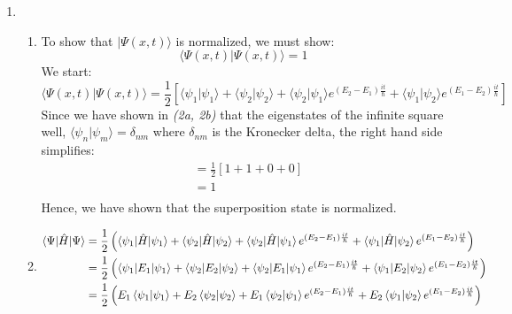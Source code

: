 \documentclass[10pt]{article}
\begin{document}
\begin{enumerate}
\begin{enumerate}
  \end{enumerate}
  \item 
    \begin{enumerate}
      \item 
        To show that $ \lvert \Psi \left( x,t \right) \rangle $ is normalized, we must show:
        \begin{equation*}
          \langle \Psi \left( x,t \right) \vert \Psi \left( x,t \right) \rangle = 1
        \end{equation*}
        We start:
        \begin{equation*}
        \langle \Psi \left( x,t \right) \vert \Psi \left( x,t \right) \rangle = \frac{1}{2}\left[ \langle \psi_{1}\vert\psi_{1} \rangle + \langle \psi_{2} \vert \psi_{2} \rangle + \langle \psi_{2} \vert \psi_{1} \rangle e ^ {\left( E_2-E_1 \right) \frac{it}{\hslash}} + \langle \psi_{1} \vert \psi_{2} \rangle e ^ {\left( E_1-E_2 \right) \frac{it}{\hslash}} \right]
        \end{equation*}
        Since we have shown in \textit{(2a, 2b)} that the eigenstates of the infinite square well, $ \langle \psi_{n} \vert \psi_{m} \rangle = \delta_{nm} $ where $ \delta_{nm} $ is the Kronecker delta, the right hand side simplifies:
        \begin{align*}
        &= \frac{1}{2} \left[ 1+1+0+0 \right]  \\
        &= 1 \\
        \end{align*}
        Hence, we have shown that the superposition state is normalized.
      \item 
        \begin{align*}
          \braket{\Psi| \hat{H} | \Psi} &= \frac{1}{2}\left( \braket{\psi_{1} | \hat{H} | \psi_{1}} + \braket{\psi_{2} | \hat{H} | \psi_{2}} + \braket{\psi_{2} | \hat{H} | \psi_{1}} e ^ {\left( E_2-E_1 \right) \frac{it}{\hslash}} + \braket{\psi_{1} | \hat{H} | \psi_{2}} e ^ {\left( E_1-E_2 \right) \frac{it}{\hslash}}\right) \\
        & = \frac{1}{2}\left( \braket{\psi_{1} | E_{1} | \psi_{1}} + \braket{\psi_{2} | E_{2} | \psi_{2}} + \braket{\psi_{2} | E_{1} | \psi_{1}} e ^ {\left( E_2-E_1 \right) \frac{it}{\hslash}} + \braket{\psi_{1} | E_{2} | \psi_{2}} e ^ {\left( E_1-E_2 \right) \frac{it}{\hslash}}\right) \\
        & = \frac{1}{2}\left( E_{1} \braket{\psi_{1} | \psi_{1}} + E_{2} \braket{\psi_{2} | \psi_{2}} + E_{1} \braket{\psi_{2} | \psi_{1}} e ^ {\left( E_2-E_1 \right) \frac{it}{\hslash}} + E_{2} \braket{\psi_{1} | \psi_{2}} e ^ {\left( E_1-E_2 \right) \frac{it}{\hslash}}\right) \\

\end{align*}
\end{enumerate}
\end{enumerate}
\end{document}

